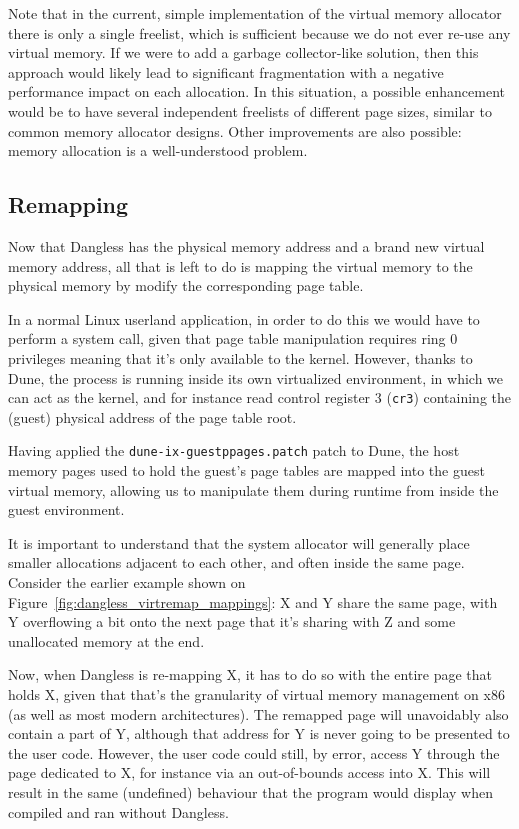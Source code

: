 Note that in the current, simple implementation of the virtual memory allocator there is only a single freelist, which is sufficient because we do not ever re-use any virtual memory. If we were to add a garbage collector-like solution, then this approach would likely lead to significant fragmentation with a negative performance impact on each allocation. In this situation, a possible enhancement would be to have several independent freelists of different page sizes, similar to common memory allocator designs. Other improvements are also possible: memory allocation is a well-understood problem.

\subsection{Remapping}
\label{ssec:remapping}

Now that Dangless has the physical memory address and a brand new virtual memory address, all that is left to do is mapping the virtual memory to the physical memory by modify the corresponding page table.

In a normal Linux userland application, in order to do this we would have to perform a system call, given that page table manipulation requires ring 0 privileges meaning that it's only available to the kernel. However, thanks to Dune, the process is running inside its own virtualized environment, in which we can act as the kernel, and for instance read control register 3 (\lstinline!cr3!) containing the (guest) physical address of the page table root.

Having applied the \texttt{dune-ix-guestppages.patch} patch to Dune, the host memory pages used to hold the guest's page tables are mapped into the guest virtual memory, allowing us to manipulate them during runtime from inside the guest environment.

It is important to understand that the system allocator will generally place smaller allocations adjacent to each other, and often inside the same page. Consider the earlier example shown on Figure~\ref{fig:dangless_virtremap_mappings}: X and Y share the same page, with Y overflowing a bit onto the next page that it's sharing with Z and some unallocated memory at the end.

Now, when Dangless is re-mapping X, it has to do so with the entire page that holds X, given that that's the granularity of virtual memory management on x86 (as well as most modern architectures). The remapped page will unavoidably also contain a part of Y, although that address for Y is never going to be presented to the user code. However, the user code could still, by error, access Y through the page dedicated to X, for instance via an out-of-bounds access into X. This will result in the same (undefined) behaviour that the program would display when compiled and ran without Dangless.


